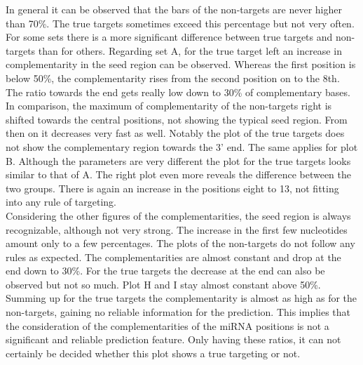 \documentclass[11pt, a4paper, twoside]{book}
\begin{document}
In general it can be observed that the bars of the non-targets are never higher than 70\%. The true targets sometimes exceed this percentage but not very often. For some sets there is a more significant difference between true targets and non-targets than for others. Regarding set A, for the true target left an increase in complementarity in the seed region can be observed. Whereas the first position is below 50\%, the complementarity rises from the second position on to the 8th. The ratio towards the end gets really low down to 30\% of complementary bases. In comparison, the maximum of complementarity of the non-targets right is shifted towards the central positions, not showing the typical seed region. From then on it decreases very fast as well. Notably the plot of the true targets does not show the complementary region towards the 3' end. The same applies for plot B. Although the parameters are very different the plot for the true targets looks similar to that of A. The right plot even more reveals the difference between the two groups. There is again an increase in the positions eight to 13, not fitting into any rule of targeting. \\

Considering the other figures of the complementarities, the seed region is always recognizable, although not very strong. The increase in the first few nucleotides amount only to a few percentages. The plots of the non-targets do not follow any rules as expected. The complementarities are almost constant and drop at the end down to 30\%. For the true targets the decrease at the end can also be observed but not so much. Plot H and I stay almost constant above 50\%.\\

Summing up for the true targets the complementarity is almost as high as for the non-targets, gaining no reliable information for the prediction. This implies that the consideration of the complementarities of the miRNA positions is not a significant and reliable prediction feature. Only having these ratios, it can not certainly be decided whether this plot shows a true targeting or not. \\
\end{document}
